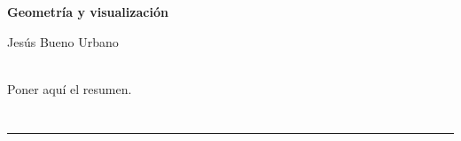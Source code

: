





\cleardoublepage
\thispagestyle{empty}

\begin{center}
{\large\bfseries Geometría y visualización}\\
\end{center}
\begin{center}
Jesús Bueno Urbano\\
\end{center}


\vspace{0.7cm}
\\

Poner aquí el resumen.
\cleardoublepage








\chapter*{}
\thispagestyle{empty}

\noindent\rule[-1ex]{\textwidth}{2pt}\\[4.5ex]

